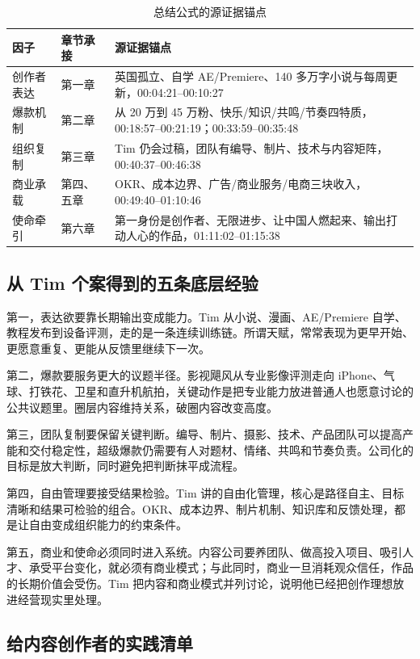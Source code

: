 \documentclass[a4paper]{article}
\begin{document}
\begin{table}[htbp]
  \centering
  \caption{总结公式的源证据锚点}
  \label{tab:summary-evidence-map}
  \begin{tabular}{lll}
    \toprule
    因子 & 章节承接 & 源证据锚点 \\
    \midrule
    创作者表达 & 第一章 & 英国孤立、自学 AE/Premiere、140 多万字小说与每周更新，00:04:21--00:10:27 \\
    爆款机制 & 第二章 & 从 20 万到 45 万粉、快乐/知识/共鸣/节奏四特质，00:18:57--00:21:19；00:33:59--00:35:48 \\
    组织复制 & 第三章 & Tim 仍会过稿，团队有编导、制片、技术与内容矩阵，00:40:37--00:46:38 \\
    商业承载 & 第四、五章 & OKR、成本边界、广告/商业服务/电商三块收入，00:49:40--01:10:46 \\
    使命牵引 & 第六章 & 第一身份是创作者、无限进步、让中国人燃起来、输出打动人心的作品，01:11:02--01:15:38 \\
    \bottomrule
  \end{tabular}
\end{table}

\subsection{从 Tim 个案得到的五条底层经验}

第一，表达欲要靠长期输出变成能力。Tim 从小说、漫画、AE/Premiere 自学、教程发布到设备评测，走的是一条连续训练链。所谓天赋，常常表现为更早开始、更愿意重复、更能从反馈里继续下一次。

第二，爆款要服务更大的议题半径。影视飓风从专业影像评测走向 iPhone、气球、打铁花、卫星和直升机航拍，关键动作是把专业能力放进普通人也愿意讨论的公共议题里。圈层内容维持关系，破圈内容改变高度。

第三，团队复制要保留关键判断。编导、制片、摄影、技术、产品团队可以提高产能和交付稳定性，超级爆款仍需要有人对题材、情绪、共鸣和节奏负责。公司化的目标是放大判断，同时避免把判断抹平成流程。

第四，自由管理要接受结果检验。Tim 讲的自由化管理，核心是路径自主、目标清晰和结果可检验的组合。OKR、成本边界、制片机制、知识库和反馈处理，都是让自由变成组织能力的约束条件。

第五，商业和使命必须同时进入系统。内容公司要养团队、做高投入项目、吸引人才、承受平台变化，就必须有商业模式；与此同时，商业一旦消耗观众信任，作品的长期价值会受伤。Tim 把内容和商业模式并列讨论，说明他已经把创作理想放进经营现实里处理。

\subsection{给内容创作者的实践清单}
\end{document}
